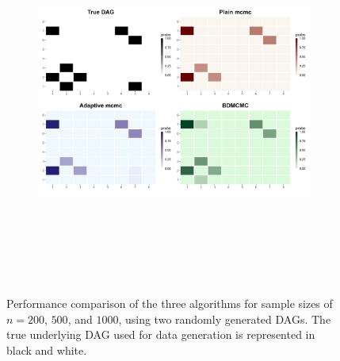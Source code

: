 \documentclass{report}
\begin{document}
\begin{figure}[!ht]
{\begin{minipage}{\textwidth}
\begin{subfigure}[b]{0.45\textwidth}
				\label{fig:heatmaps-500}
			\end{subfigure}
			\hspace{0.35cm}
			\begin{subfigure}[b]{0.45\textwidth}   
				\centering
				\includegraphics[width=\textwidth, height=12cm]{Figures/Overall_comparison/Random_dags/heat_dag_2_n_1000.png}
				\label{fig:heatmaps-500}
			\end{subfigure}
		\end{minipage}
	}
	\caption{Performance comparison of the three algorithms for sample sizes of $n = 200$, $500$, and $1000$, using two randomly generated DAGs. The true underlying DAG used for data generation is represented in black and white.}
	\label{fig: one-two-dags}
\end{figure}
\end{document}

